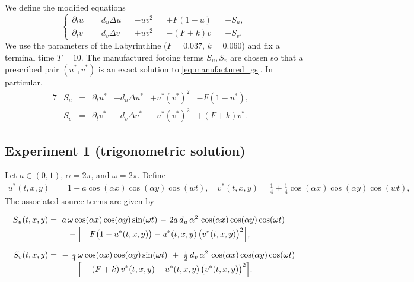 \documentclass[11pt, a4paper]{amsart}
\numberwithin{equation}{section}
\begin{document}
	We define the modified equations 
	\begin{equation} \label{eq:manufactured_gs}
		\left\{
		\begin{alignedat}{6}
			\partial_t u &= d_u \Delta u &&- uv^2 &&+ F(1 - u) && + S_u, 
			\\
			\partial_t v &= d_v \Delta v &&+ uv^2 &&- (F + k)v &&+ S_v.
		\end{alignedat}
		\right.
	\end{equation}
	We use the parameters of the Labyrinthine ($F = 0.037$, $k = 0.060$) and fix a terminal time $T = 10$.
	The manufactured forcing terms $S_u, S_v$ are chosen so that a prescribed pair $(u^*,v^*)$ is an exact solution to \eqref{eq:manufactured_gs}. In particular,
	\begin{alignat*}{7}
		&S_u &{}={} &\partial_t u^* &- d_u \Delta u^* &+ u^*(v^*)^2 &- F(1 - u^*),&
		\\
		&S_v &{}= {}&\partial_t v^* &- d_v \Delta v^* &- u^*(v^*)^2 &+ (F+k)v^*.&
	\end{alignat*}
	
	\subsection*{Experiment 1 (trigonometric solution)}
	Let $a\in (0,1)$, $\alpha = 2\pi$, and $\omega = 2\pi$. Define
	\begin{align*}
		u^*(t,x,y) &= 1 - a\cos(\alpha x)\cos(\alpha y)\cos(w t),\quad
		v^*(t,x,y) = \frac14 +\frac14\cos(\alpha x)\cos(\alpha y)\cos(w t),
	\end{align*}
	The associated source terms are given by
	
	\begin{alignat*}{4}
		S_u(t,x,y) ={}&\ a \,\omega \cos(\alpha x)\cos(\alpha y)\sin(\omega t)
		\ {-\ } 2a\,d_u\,\alpha^2\,\cos(\alpha x)\cos(\alpha y)\cos(\omega t)
		\\[-2pt]
		&\quad {}- \Big[\hphantom{-}\,F\big(1 - u^*(t,x,y)\big) - u^*(t,x,y)\,\big(v^*(t,x,y)\big)^2 \Big],
		\\[6pt]
		S_v(t,x,y) ={}&\ {-\ }\tfrac{1}{4}\,\omega \cos(\alpha x)\cos(\alpha y)\sin(\omega t)
		\ +\ \tfrac{1}{2}\,d_v\,\alpha^2\,\cos(\alpha x)\cos(\alpha y)\cos(\omega t)
		\\[-2pt]
		&\quad {}- \Big[ - (F+k)\,v^*(t,x,y) + u^*(t,x,y)\,\big(v^*(t,x,y)\big)^2\Big].
	\end{alignat*}
	
\end{document}
